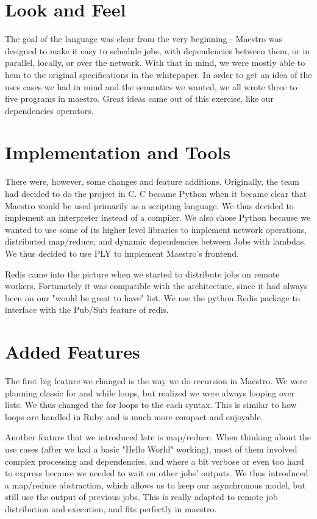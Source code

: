 \section{Look and Feel}
The goal of the language was clear from the very beginning - Maestro was designed to make it easy to schedule jobs, with dependencies between them, or in parallel, locally, or over the network.
With that in mind, we were mostly able to hem to the original specifications in the whitepaper.
In order to get an idea of the uses cases we had in mind and the semantics we wanted, we all wrote three to five programs in maestro.
Great ideas came out of this exercise, like our dependencies operators.

\section{Implementation and  Tools}
There were, however, some changes and feature additions. Originally, the team had decided to do the project in C. C became Python when it became clear that Maestro would be used primarily as a scripting language. We thus decided to implement an interpreter instead of a compiler.
We also chose Python because we wanted to use some of its higher level libraries to implement network operations, distributed map/reduce, and dynamic dependencies between Jobs with lambdas.
We thus decided to use PLY to implement Maestro's frontend.

Redis came into the picture when we started to distribute jobs on remote workers.
Fortunately it was compatible with the architecture, since it had always been on our "would be great to have" list.
We use the python Redis package to interface with the Pub/Sub feature of redis.

\section{Added Features}
The first big feature we changed is the way we do recursion in Maestro. We were planning classic for and while loops, but realized we were always looping over lists.
We thus changed the for loops to the each syntax. This is similar to how loops are handled in Ruby and is much more compact and enjoyable.

Another feature that we introduced late is map/reduce. When thinking about the use cases (after we had a basic "Hello World" working), most of them involved complex processing and dependencies, and where a bit verbose or even too hard to express because we needed to wait on other jobs' outputs.
We thus introduced a map/reduce abstraction, which allows us to keep our asynchronous model, but still use the output of previous jobs.
This is really adapted to remote job distribution and execution, and fits perfectly in maestro.

